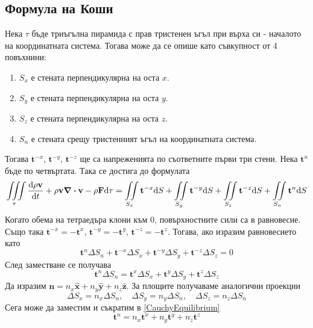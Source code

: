 \documentclass[bulgarian, 12pt]{article}
\begin{document}
\subsection{Формула на Коши}
Нека $\tau$ бъде триъгълна пирамида с прав тристенен ъгъл при върха си - началото на координатната система.
Тогава може да се опише като съвкупност от 4 повъхнини:
\begin{enumerate}
	\item $S_x$ е стената перпендикулярна на оста $x$.
	\item $S_y$ е стената перпендикулярна на оста $y$.
	\item $S_z$ е стената перпендикулярна на оста $z$.
	\item $S_n$ е стената срещу тристенният ъгъл на координатната система.
\end{enumerate}
Тогава $\mathbf{t}^{-x}$, $\mathbf{t}^{-y}$, $\mathbf{t}^{-z}$ ще са напреженията по съответните първи три стени.
Нека $\mathbf{t}^{n}$ бъде по четвъртата. Така се достига до формулата
\begin{equation}
	\iiint\limits_{\tau} \dv{\rho \mathbf{v}}{t} + \rho \mathbf{v} \div \mathbf{v} - \rho \mathbf{F} \dd \tau =
	\iint\limits_{S_x} \mathbf{t}^{-x} \dd S + \iint\limits_{S_y} \mathbf{t}^{-y} \dd S + \iint\limits_{S_z} \mathbf{t}^{-z} \dd S + \iint\limits_{S_n} \mathbf{t}^{n} \dd S
\end{equation}
Когато обема на тетраедъра клони към $0$, повърхностните сили са в равновесие.
Също така $\mathbf{t}^{-x} = - \mathbf{t}^{x},\, \mathbf{t}^{-y} = - \mathbf{t}^{y},\, \mathbf{t}^{-z} = - \mathbf{t}^{z}$.
Тогава, ако изразим равновесието като
\begin{equation}
	\mathbf{t}^{n} \Delta S_n + \mathbf{t}^{-x} \Delta S_x + \mathbf{t}^{-y} \Delta S_y + \mathbf{t}^{-z} \Delta S_z = 0
\end{equation}
След заместване се получава
\begin{equation}
	\label{CauchyEquilibrium} \mathbf{t}^{n} \Delta S_n = \mathbf{t}^{x} \Delta S_x + \mathbf{t}^{y} \Delta S_y + \mathbf{t}^{z} \Delta S_z
\end{equation}
Да изразим $\mathbf{n} = n_x \hat{\mathbf{x}} + n_y \hat{\mathbf{y}} + n_z \hat{\mathbf{z}}$.
За площите получаваме аналогични проекции
\begin{equation}
	\Delta S_x = n_x \Delta S_n,\quad \Delta S_y = n_y \Delta S_n,\quad \Delta S_z = n_z \Delta S_n
\end{equation}
Сега може да заместим и съкратим в \eqref{CauchyEquilibrium}
\begin{equation}
	\mathbf{t}^{n} = n_x \mathbf{t}^{x} + n_y \mathbf{t}^{y} + n_z \mathbf{t}^{z}
\end{equation}
\end{document}
